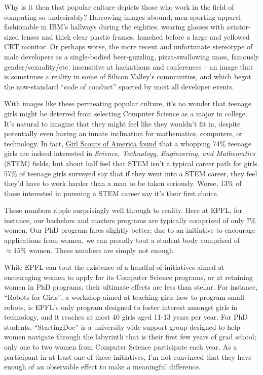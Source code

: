 \documentclass[acmtocl]{acmtrans2m}
\begin{document}
Why is it then that popular culture depicts those who work in the field of
computing so undesirably? Harrowing images abound; men sporting apparel
fashionable in IBM's hallways during the eighties, wearing glasses with
aviator-sized lenses and thick clear plastic frames, hunched before a large
and yellowed CRT monitor. Or perhaps worse, the more recent and unfortunate
stereotype of male developers as a {single-bodied} {beer-guzzling},
{pizza-swallowing} mass, famously gender/sexuality/etc. insensitive at
hackathons and conferences -- an image that is sometimes a reality in
some of Silicon Valley's communities, and which begot the {now-standard} ``code
of conduct'' sported by most all developer events.

With images like these permeating popular culture, it's no wonder that teenage
girls might be deterred from selecting Computer Science as a major in college.
It's natural to imagine that they might feel like they wouldn't fit in,
despite potentially even having an innate inclination for mathematics,
computers, or technology. In fact,
\href{https://www.girlscouts.org/research/pdf/generation\_stem\_full\_report.pdf}{Girl Scouts of America found}
\cite{Girlscouts} that a whopping 74\% teenage girls are indeed interested in {\em
Science, Technology, Engineering, and Mathematics} (STEM) fields, but about
half feel that STEM isn't a typical career path for girls. 57\% of teenage
girls surveyed say that if they went into a STEM career, they feel they'd have
to work harder than a man to be taken seriously. Worse, 13\% of those
interested in pursuing a STEM career say it's their first choice.

These numbers ripple surprisingly well through to reality. Here at EPFL, for
instance, our bachelors and masters programs are typically comprised of only
\href{http://www.swissict.ch/fileadmin/award/Impressionen/Symposium/WillyZwaenepoel\_ICT-Akademie.pdf}{$7\%$}~\cite{Willy}
women. Our PhD program fares slightly better; due to an initiative to
encourage applications from women, we can proudly tout a student body
comprised of $\approx15\%$ women. These numbers are simply not enough.

While EPFL can tout the existence of a handful of initiatives aimed at
encouraging women to apply for its Computer Science programs, or at retaining
women in PhD programs, their ultimate effects are less than stellar. For
instance, ``Robots for Girls'', a workshop aimed at teaching girls how to
program small robots, is EPFL's only program designed to foster interest
amongst girls in technology,
and it reaches at most 40 girls aged 11-13 years per year.
For PhD students, ``StartingDoc'' is a university-wide support group designed
to help women navigate through the labyrinth that is their first few years of
grad school; only one to two women from Computer Science participate each year.
As a participant in at least one of these initiatives, I'm not convinced that
they have enough of an observable effect to make a meaningful difference.
\end{document}
